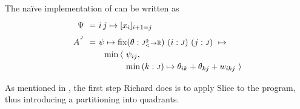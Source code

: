 \newcommand\vtyped[2]{\underset{\scriptscriptstyle ( #2 )}{ #1 }}
\newcommand\htyped[2]{({#1} : {\scriptstyle{#2}})}

\makeatletter
\newcommand{\quadrants@normal}[4]{
  \renewcommand\arraystretch{1.5}
   \begin{array}{c|c}
     #1 & #2 \\ \hline
     #3 & #4
   \end{array}}
\newcommand{\quadrants@small}[4]{
  \renewcommand\arraystretch{0.9}
   \begin{array}{@{~}c@{~}|@{~}c@{~}}
     \scriptstyle #1 & \scriptstyle #2 \\ \hline
     \scriptstyle #3 & \scriptstyle #4
   \end{array}}
\newcommand\quadrants{\@ifstar\quadrants@small\quadrants@normal}
\makeatother


\exampleTitle

\noindent
The na\"ive implementation of 
can be written as
%
\begin{equation}
  \renewcommand\arraystretch{1.2}
  \begin{array}{@{}r@{}l@{}}
    \Psi ~=~ & i\,j\mapsto
	           [x_i]_{i+1=j} \\[2mm]
%
    A^{^{J}} ~=~ 
	      & \psi\mapsto \fix 
	        \htyped{\theta}{J^2_{\fontsize{20}{22}\selectfont <}\to\R}~ \htyped{i}{J} ~ \htyped{j}{J}
	        ~\mapsto \\
	      &
          ~~
	      \begin{array}{@{}l@{}l@{}} 
	        \min\,\langle~ & \psi_{ij}, \\
	         & \min\, \htyped k J \mapsto\theta_{ik}+\theta_{kj}+w_{ikj}
	        ~\rangle
	      \end{array}
  \end{array}
  \label{tactics:paren phase A}
\end{equation}


As mentioned in , the first step Richard does is to apply
{\sf Slice} to the program, thus introducing a partitioning into quadrants.

\smallskip

